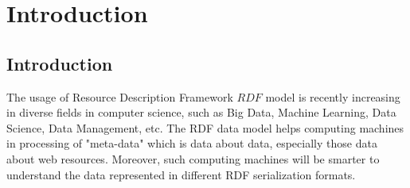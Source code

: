 \chapter{Introduction}
\label{ch:introduction}



\section{Introduction}

%
%
%
%
%
%
%
%
%




\par The usage of Resource Description Framework \(RDF\) model is recently increasing in diverse fields in computer science, such as Big Data, Machine Learning, Data Science, Data Management, etc. The RDF data model helps computing machines in processing of "meta-data" which is data about data, especially those data about web resources. Moreover, such computing machines will be smarter to understand the data represented in different RDF serialization formats. 

